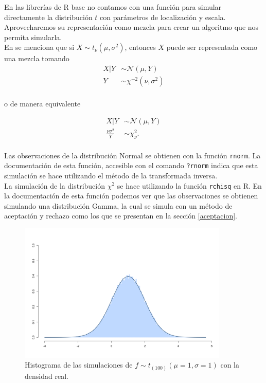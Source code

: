 \documentclass[11pt,a4paper]{article}
\begin{document}
En las librerías de R base no contamos con una función para simular directamente la distribución $t$ con parámetros de localización y escala. Aprovecharemos su representación como mezcla para crear un algoritmo que nos permita simularla.\\

En \citet{gelman} se menciona que si $X\sim t_\nu (\mu, \sigma^2)$, entonces $X$ puede ser representada como una mezcla tomando 
\begin{align*}
X|Y &\sim \mathcal{N}(\mu , Y)\\
Y &\sim \chi ^{-2}(\nu, \sigma ^2)\\
\end{align*}

o de manera equivalente

\begin{align*}
X|Y &\sim \mathcal{N}(\mu , Y)\\
\frac{\nu\sigma ^2}{Y} &\sim \chi ^2_{\nu}.\\
\end{align*}

Las observaciones de la distribución Normal se obtienen con la función \texttt{rnorm}. La documentación de esta función, accesible con el comando \texttt{?rnorm} indica que esta simulación se hace utilizando el método de la transformada inversa.\\

La simulación de la distribución $\chi^2$ se hace utilizando la función \texttt{rchisq} en R. En la documentación de esta función podemos ver que las observaciones se obtienen simulando una distribución Gamma, la cual se simula con un método de aceptación y rechazo como los que se presentan en la sección \ref{aceptacion}.\\

\begin{figure}[H] 
\centering\includegraphics[width=10cm]{sim_mezcla.png}
\caption{Histograma de las simulaciones de $f \sim t_{(100)} (\mu = 1, \sigma = 1)$ con la densidad real.}
\label{fig:t}
\end{figure}
\end{document}
